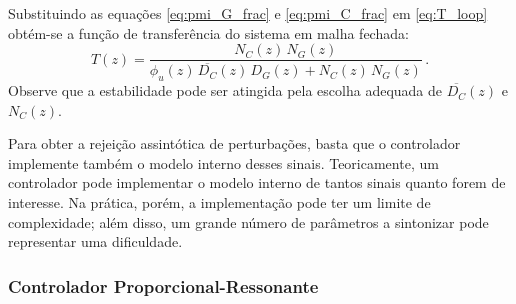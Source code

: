 \documentclass[repeatfields,oneside]{tcc}
\newcommand{\mycdot}{ \, }
\begin{document}


Substituindo as equações \eqref{eq:pmi_G_frac} e \eqref{eq:pmi_C_frac} em \eqref{eq:T_loop} obtém-se a função de transferência do sistema em malha fechada:
\begin{equation}\label{eq:pmi_T}
    T(z) = \dfrac{ N_C(z) \mycdot N_G(z) }{ \phi_u(z) \mycdot \overline{D_C}(z) \mycdot D_G(z) + N_C(z) \mycdot N_G(z) }
    \,.
\end{equation}
Observe que a estabilidade pode ser atingida pela escolha adequada de $\overline{D_C}(z)$ e $N_C(z)$.

Para obter a rejeição assintótica de perturbações, basta que o controlador implemente também o modelo interno desses sinais.
Teoricamente, um controlador pode implementar o modelo interno de tantos sinais quanto forem de interesse.
Na prática, porém, a implementação pode ter um limite de complexidade;
além disso, um grande número de parâmetros a sintonizar pode representar uma dificuldade.


\subsubsection{Controlador Proporcional-Ressonante}\label{sec:controle_PR}
\end{document}

